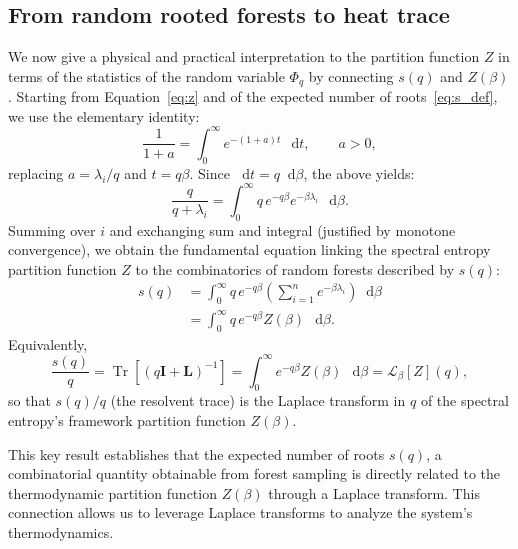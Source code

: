 \documentclass[10pt,aps,pre,twocolumn,nofootinbib,superscriptaddress,longbibliography]{revtex4-2}
\newcommand\dif{\mathop{}\!\mathrm{d}}
\newcommand{\bI}{\mathbf{I}}
\newcommand{\bL}{\mathbf{L}}
\newcommand{\Tr}[1]{\operatorname{Tr}\left\lbrack #1\right\rbrack}
\begin{document}
\subsection{From random rooted forests to heat trace}
We now give a physical and practical interpretation to the partition function $Z$ in terms of the statistics of the random variable $\Phi_q$ by connecting $s(q)$ and $Z(\beta)$.
Starting from Equation~\ref{eq:z} and of the expected number of roots~\ref{eq:s_def}, we use the elementary identity:
\begin{equation}
\frac{1}{1+a} = \int_0^\infty e^{-(1+a)t}\,\dif t,\qquad a>0,
\end{equation}
replacing $a=\lambda_i/q$ and $t=q\beta$. 
Since $\dif t=q\dif \beta$, the above yields:
\begin{equation}
\frac{q}{q+\lambda_i} = \int_0^\infty q\,e^{-q\beta}e^{-\beta\lambda_i}\,\dif \beta.
\end{equation}
Summing over $i$ and exchanging sum and integral (justified by monotone convergence), we obtain the fundamental equation linking the spectral entropy partition function $Z$ to the combinatorics of random forests described by $s(q)$:
\begin{align}\label{eq:bridge}
s(q) &= \int_0^\infty q\,e^{-q\beta}\left(\sum_{i=1}^n e^{-\beta\lambda_i}\right)\dif \beta \\ 
    &= \int_0^\infty q\,e^{-q\beta} Z(\beta)\,\dif \beta.
\end{align}
Equivalently,
\begin{equation}\label{eq:laplace_transform}
  \frac{s(q)}{q} = \Tr{(q\bI + \bL)^{-1}} = \int_0^\infty e^{-q\beta} Z(\beta)\,\dif \beta
  = \mathcal{L}_\beta[Z](q),
\end{equation}
so that $s(q)/q$ (the resolvent trace) is the Laplace transform in $q$ of the spectral entropy's framework partition function $Z(\beta)$.

This key result establishes that the expected number of roots $s(q)$, a combinatorial quantity obtainable from forest sampling is directly related to the thermodynamic partition function $Z(\beta)$ through a Laplace transform. 
This connection allows us to leverage Laplace transforms to analyze the system's thermodynamics.
\end{document}
